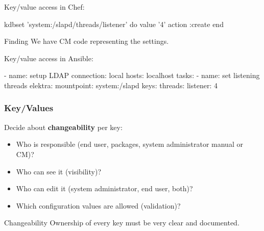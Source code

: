 \begin{frame}[fragile]
	Key/value access in Chef:
	\vspace{0.5cm}

	\begin{code}[morekeywords={kdbset,do,action,value,end},gobble=4]
	kdbset 'system:/slapd/threads/listener' do
		value '4'
		action :create
	end
	\end{code}

	\pause
	\begin{alertblock}{Finding}
	We have CM code representing the settings.
	\end{alertblock}
\end{frame}

\begin{frame}[fragile]
	Key/value access in Ansible:
	\vspace{0.5cm}

	\begin{code}[morekeywords={name,connection,key,value,elektra,mountpoint,file,plugins,hosts,tasks},gobble=4]
	- name: setup LDAP
	  connection: local
	  hosts: localhost
	  tasks:
	  - name: set listening threads
	    elektra:
	      mountpoint: system:/slapd
	      keys:
	        threads:
	          listener: 4
	\end{code}
\end{frame}

\begin{frame}
	\frametitle{Key/Values}

	Decide about \textbf{changeability} per key:

	\begin{itemize}[<+-| alert@+>]
	\item Who is responsible (end user, packages, system administrator manual or CM)?
	\item Who can see it (visibility)?
	\item Who can edit it (system administrator, end user, both)?
	\item Which configuration values are allowed (validation)?
	\end{itemize}

	\pause[\thebeamerpauses]  %

	\begin{alertblock}{Changeability}
	Ownership of every key must be very clear and documented.
	\end{alertblock}
\end{frame}

